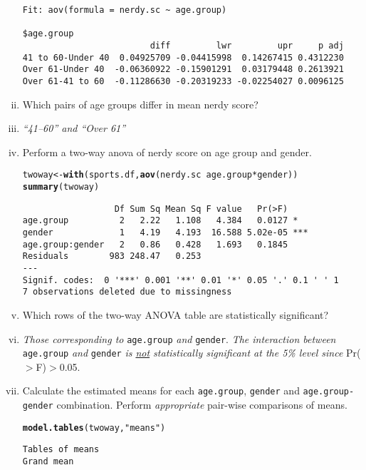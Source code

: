\documentclass[12pt,a4paper]{article}\usepackage[]{graphicx}\usepackage[]{color}
\makeatletter
\newcommand{\hlstr}[1]{\textcolor[rgb]{0.192,0.494,0.8}{#1}}%
\newcommand{\hlopt}[1]{\textcolor[rgb]{0,0,0}{#1}}%
\newcommand{\hlstd}[1]{\textcolor[rgb]{0.345,0.345,0.345}{#1}}%
\newcommand{\hlkwb}[1]{\textcolor[rgb]{0.69,0.353,0.396}{#1}}%
\newcommand{\hlkwd}[1]{\textcolor[rgb]{0.737,0.353,0.396}{\textbf{#1}}}%
\newenvironment{kframe}{%
 \def\at@end@of@kframe{}%
 \ifinner\ifhmode%
  \def\at@end@of@kframe{\end{minipage}}%
  \begin{minipage}{\columnwidth}%
 \fi\fi%
 \def\FrameCommand##1{\hskip\@totalleftmargin \hskip-\fboxsep
 \colorbox{shadecolor}{##1}\hskip-\fboxsep
     \hskip-\linewidth \hskip-\@totalleftmargin \hskip\columnwidth}%
 \MakeFramed {\advance\hsize-\width
   \@totalleftmargin\z@ \linewidth\hsize
   \@setminipage}}%
 {\par\unskip\endMakeFramed%
 \at@end@of@kframe}
\newenvironment{knitrout}{}{} %
\makeatother
\begin{document}
\begin{enumerate}[(i)]
\begin{knitrout}
\begin{kframe}
\begin{verbatim}
Fit: aov(formula = nerdy.sc ~ age.group)

$age.group
                         diff         lwr         upr     p adj
41 to 60-Under 40  0.04925709 -0.04415998  0.14267415 0.4312230
Over 61-Under 40  -0.06360922 -0.15901291  0.03179448 0.2613921
Over 61-41 to 60  -0.11286630 -0.20319233 -0.02254027 0.0096125
\end{verbatim}
\end{kframe}
\end{knitrout}
\item Which pairs of age groups differ in mean nerdy score?
\item[] {\em ``41--60'' and ``Over 61''}
\item Perform a two-way anova of nerdy score on age group and gender.
\begin{knitrout}
\color{fgcolor}\begin{kframe}
\begin{alltt}
\hlstd{twoway} \hlkwb{<-} \hlkwd{with}\hlstd{(sports.df,} \hlkwd{aov}\hlstd{(nerdy.sc}\hlopt{~}\hlstd{age.group}\hlopt{*}\hlstd{gender))}
\hlkwd{summary}\hlstd{(twoway)}
\end{alltt}
\begin{verbatim}
                  Df Sum Sq Mean Sq F value   Pr(>F)    
age.group          2   2.22   1.108   4.384   0.0127 *  
gender             1   4.19   4.193  16.588 5.02e-05 ***
age.group:gender   2   0.86   0.428   1.693   0.1845    
Residuals        983 248.47   0.253                     
---
Signif. codes:  0 '***' 0.001 '**' 0.01 '*' 0.05 '.' 0.1 ' ' 1
7 observations deleted due to missingness
\end{verbatim}
\end{kframe}
\end{knitrout}
\item Which rows of the two-way ANOVA table are statistically significant? \item[] {\em Those corresponding to} \texttt{age.group} {\em and} \texttt{gender}. {\em The interaction between} \texttt{age.group} {\em and} \texttt{gender} {\em is \underline{not} statistically significant at the 5\% level since} Pr($>$F)$>$0.05.

\item Calculate the estimated means for each \texttt{age.group}, \texttt{gender} and \texttt{age.group-gender} combination. Perform {\em appropriate} pair-wise comparisons of means.
\begin{knitrout}
\color{fgcolor}\begin{kframe}
\begin{alltt}
\hlkwd{model.tables}\hlstd{(twoway,} \hlstr{"means"}\hlstd{)}
\end{alltt}
\begin{verbatim}
Tables of means
Grand mean
         

\end{verbatim}
\end{kframe}
\end{knitrout}
\end{enumerate}
\end{document}
